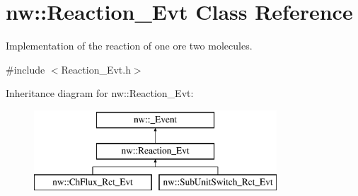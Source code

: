 \hypertarget{classnw_1_1_reaction___evt}{\section{nw\+:\+:Reaction\+\_\+\+Evt Class Reference}
\label{classnw_1_1_reaction___evt}
}


Implementation of the reaction of one ore two molecules.  




{\ttfamily \#include $<$Reaction\+\_\+\+Evt.\+h$>$}

Inheritance diagram for nw\+:\+:Reaction\+\_\+\+Evt\+:\begin{figure}[H]
\begin{center}
\leavevmode
\includegraphics[height=3.000000cm]{d1/d8c/classnw_1_1_reaction___evt}
\end{center}
\end{figure}
